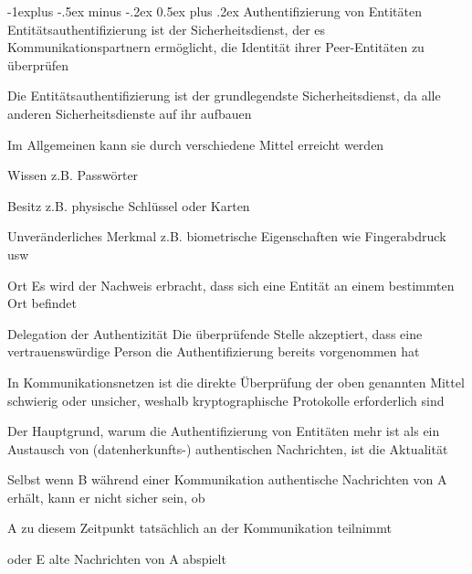 \documentclass[a4paper]{article}
\makeatletter
\renewcommand{\subsection}{\@startsection{subsection}{2}{0mm}%
 {-1explus -.5ex minus -.2ex}%
 {0.5ex plus .2ex}%
 {\normalfont\normalsize\bfseries}}
\makeatother
\begin{document}
\begin{multicols}{3}
      \subsection{Authentifizierung von Entitäten}
      Entitätsauthentifizierung ist der Sicherheitsdienst, der es Kommunikationspartnern ermöglicht, die Identität ihrer Peer-Entitäten zu überprüfen
      \begin{itemize*}
            \item Die Entitätsauthentifizierung ist der grundlegendste Sicherheitsdienst, da alle anderen Sicherheitsdienste auf ihr aufbauen
            \item Im Allgemeinen kann sie durch verschiedene Mittel erreicht werden
            \begin{description*}
                  \item[Wissen] z.B. Passwörter
                  \item[Besitz] z.B. physische Schlüssel oder Karten
                  \item[Unveränderliches Merkmal] z.B. biometrische Eigenschaften wie Fingerabdruck usw
                  \item[Ort] Es wird der Nachweis erbracht, dass sich eine Entität an einem bestimmten Ort befindet
                  \item[Delegation der Authentizität] Die überprüfende Stelle akzeptiert, dass eine vertrauenswürdige Person die Authentifizierung bereits vorgenommen hat
            \end{description*}
            \item In Kommunikationsnetzen ist die direkte Überprüfung der oben genannten Mittel schwierig oder unsicher, weshalb kryptographische Protokolle erforderlich sind
            \item Der Hauptgrund, warum die Authentifizierung von Entitäten mehr ist als ein Austausch von (datenherkunfts-) authentischen Nachrichten, ist die Aktualität
            \begin{itemize*}
                  \item Selbst wenn B während einer Kommunikation authentische Nachrichten von A erhält, kann er nicht sicher sein, ob
                  \begin{itemize*}
                        \item A zu diesem Zeitpunkt tatsächlich an der Kommunikation teilnimmt
                        \item oder E alte Nachrichten von A abspielt
                  \end{itemize*}

\end{itemize*}
\end{itemize*}
\end{multicols}
\end{document}
